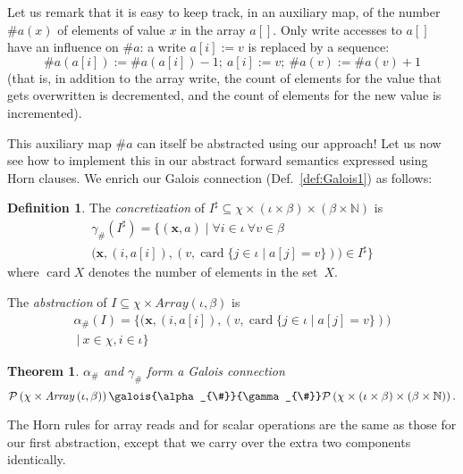 \documentclass[a4paper]{article}
\newcommand{\ve}[1]{\mathbf{#1}}
\newcommand{\vx}{\ve{x}}
\newcommand{\NN}{\mathbb{N}}
\newcommand{\arraytype}[2]{\mathit{Array}\left(#1,#2\right)}
\newcommand{\abstr}[1]{#1^\sharp}
\newcommand{\parts}[1]{\mathcal{P}\left(#1\right)}
\newcommand{\abstraction}[2][]{\alpha_{#1}\left(#2\right)}
\newcommand{\concretization}[2][]{\gamma_{#1}\left(#2\right)}
\newcommand{\hash}{\#}
\DeclareMathOperator{\card}{card}
\theoremstyle{definition}
\newtheorem{definition}{Definition}
\theoremstyle{plain}
\newtheorem{theorem}{Theorem}
\begin{document}
Let us remark that it is easy to keep track, in an auxiliary map, of the number $\hash a(x)$ of elements of value $x$ in the array $a[]$.
Only write accesses to $a[]$ have an influence on $\hash a$: a write $a[i]:=v$ is replaced by a sequence:
\begin{equation}\label{formula:array_multiset_write_sequence}
\hash a(a[i]) := \hash a(a[i])-1;~ a[i]:=v;~ \hash a(v) := \hash a(v)+1
\end{equation}
(that is, in addition to the array write, the count of elements for the value that gets overwritten is decremented, and the count of elements for the new value is incremented).

This auxiliary map $\hash a$ can itself be abstracted using our approach!
Let us now see how to implement this in our abstract forward semantics expressed using Horn clauses.
We enrich our Galois connection (Def.~\ref{def:Galois1}) as follows:
\begin{definition}\label{def:Galois1count}
The \emph{concretization} of $\abstr{I} \subseteq \chi \times (\iota \times \beta) \times (\beta \times \NN)$ is
\begin{multline}
\concretization[\hash]{\abstr{I}} = \Big\{ (\vx,a) \mid
  \forall i\in\iota~ \forall v \in \beta~\\
  \big(\vx,(i,a[i]),
  (v,\card \{ j \in \iota \mid a[j] = v \})\big) \in \abstr{I} \Big\}
\end{multline}
where $\card X$ denotes the number of elements in the set~$X$.

The \emph{abstraction} of $I \subseteq \chi \times \arraytype{\iota}{\beta}$ is
\begin{multline}
\abstraction[\hash]{I} = \Big\{ \big(\vx,(i,a[i]),(v,\card \{ j \in \iota \mid a[j] = v \})\big)\\ ~\Big|~ x \in \chi, i \in \iota \Big\}
\end{multline}
\end{definition}

\begin{theorem}
$\alpha_{\hash}$ and $\gamma_{\hash}$ form a Galois connection
\begin{equation*}
 \parts{\chi \times \arraytype{\iota}{\beta}}
 \galois{\alpha_{\hash}}{\gamma_{\hash}}
  \parts{\chi \times (\iota \times \beta) \times (\beta \times \NN)}.
\end{equation*}
\end{theorem}

The Horn rules for array reads and for scalar operations are the same as those for our first abstraction, except that we carry over the extra two components identically.
\end{document}
